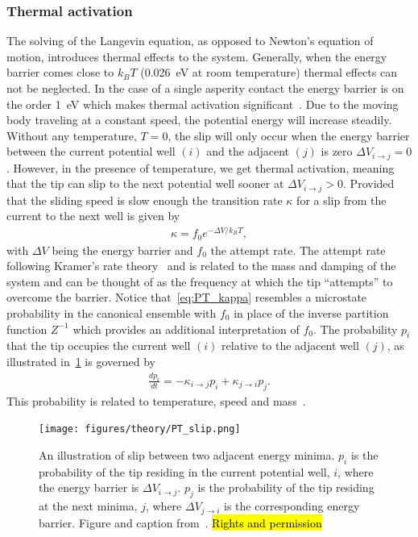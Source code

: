 \subsubsection{Thermal activation}
The solving of the Langevin equation, as opposed to Newton's equation of motion, introduces thermal effects to the system. Generally, when the energy barrier comes close to $k_B T$ (\SI{0.026}{eV} at room temperature) thermal effects can not be neglected. In the case of a single asperity contact the energy barrier is on the order \SI{1}{eV} which makes thermal activation significant~\cite{Yalin_2011}. Due to the moving body traveling at a constant speed, the potential energy will increase steadily. Without any temperature, $T = 0$, the slip will only occur when the energy barrier between the current potential well $(i)$ and the adjacent $(j)$ is zero $\Delta V_{i\to j} = 0$. However, in the presence of temperature, we get thermal activation, meaning that the tip can slip to the next potential well sooner at $\Delta V_{i\to j} > 0$. Provided that the sliding speed is slow enough the transition rate $\kappa$ for a slip from the current to the next well is given by
\begin{align}
  \kappa = f_0 e^{-\Delta V / k_B T},
  \label{eq:PT_kappa}
\end{align}
with $\Delta V$ being the energy barrier and $f_0$ the attempt rate. The attempt rate following Kramer’s rate theory~\cite{RevModPhys.62.251} and is related to the mass and damping of the system and can be thought of as the frequency at which the tip ``attempts'' to overcome the barrier. Notice that~\cref{eq:PT_kappa} resembles a microstate probability in the canonical ensemble with $f_0$ in place of the inverse partition function $Z^{-1}$ which provides an additional interpretation of $f_0$. The probability $p_i$ that the tip occupies the current well $(i)$ relative to the adjacent well $(j)$, as illustrated in~\cref{fig:PT_slip} is governed by 
\begin{align}
  \frac{dp_i}{dt} = -\kappa_{i\to j}p_i + \kappa_{j\to i}p_j.
  \label{eq:dpdt_PT}
\end{align}
This probability is related to temperature, speed and mass~\cite{Yalin_2011}.

\begin{figure}[H]
  \centering
  \texttt{[image: figures/theory/PT\_slip.png]}
  \caption{An illustration of slip between two adjacent energy minima. $p_i$ is the probability of the tip residing in the current potential well, $i$, where the energy barrier is $\Delta V_{i \rightarrow j}$. $p_j$ is the probability of the tip residing at the next minima, $j$, where $\Delta V_{j \rightarrow i}$ is the corresponding energy barrier. Figure and caption from~\cite{Yalin_2011}. \hl{Rights and permission}}
  \label{fig:PT_slip}
\end{figure}


